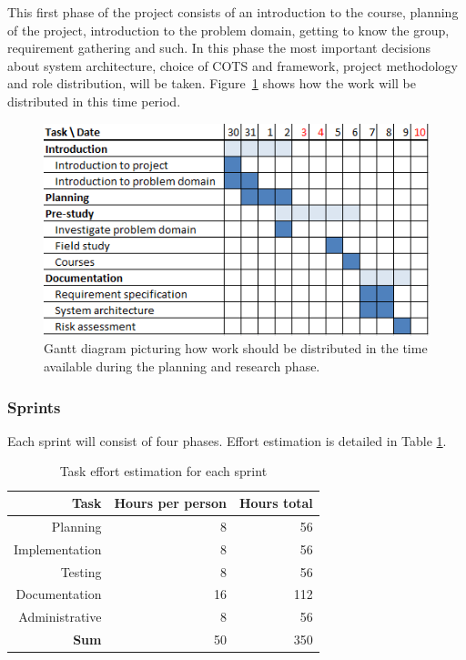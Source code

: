 This first phase of the project consists of an introduction to the course,
planning of the project, introduction to the problem domain, getting to know
the group, requirement gathering and such. In this phase the most important
decisions about system architecture, choice of COTS and framework, project
methodology and role distribution, will be taken. Figure~\ref{gantt:pre_imp}
shows how the work will be distributed in this time period.

\begin{figure}[h]
\centering
  \includegraphics[width=1.0\textwidth]{project_management/pre_implementation_gantt}
  \caption[Gantt chart of planning and research phase]{Gantt diagram picturing how work should be distributed in the time available during the planning and research phase.}
  \label{gantt:pre_imp}
\end{figure}

\subsubsection{Sprints}

Each sprint will consist of four phases. Effort estimation is
detailed in Table \ref{Sprint effort estimation}.

\begin{table}[htbp]
\begin{center}
  \begin{tabular}{|r|r|r|}
    \hline
    \bf{Task} & \bf{Hours per person} & \bf{Hours total} \\
    \hline
    Planning & 8 & 56 \\
    Implementation & 8 & 56 \\
    Testing & 8 & 56 \\
    Documentation & 16 & 112 \\
    Administrative & 8 & 56 \\
    \hline \hline
    \bf{Sum} & 50 & 350 \\
    \hline
  \end{tabular}
  \caption{Task effort estimation for each sprint}
  \label{Sprint effort estimation}
\end{center}
\end{table}

